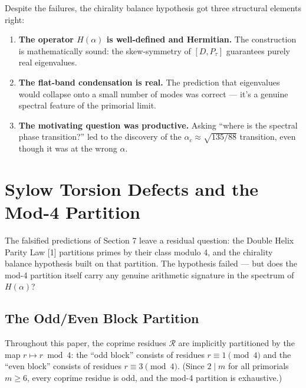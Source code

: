\documentclass[11pt,letterpaper]{article}
\theoremstyle{definition}
\theoremstyle{remark}
\begin{document}
Despite the failures, the chirality balance hypothesis got three structural elements right:

\begin{enumerate}
\item
  \textbf{The operator $H(\alpha)$ is well-defined and Hermitian.} The construction is mathematically sound: the skew-symmetry of $[D, P_\tau]$ guarantees purely real eigenvalues.
\item
  \textbf{The flat-band condensation is real.} The prediction that eigenvalues would collapse onto a small number of modes was correct --- it's a genuine spectral feature of the primorial limit.
\item
  \textbf{The motivating question was productive.} Asking ``where is the spectral phase transition?'' led to the discovery of the $\alpha_c \approx \sqrt{135/88}$ transition, even though it was at the wrong $\alpha$.
\end{enumerate}

\section{Sylow Torsion Defects and the Mod-4 Partition}\label{sylow-torsion-defects-and-the-mod-4-partition}

The falsified predictions of Section 7 leave a residual question: the Double Helix Parity Law [1] partitions primes by their class modulo 4, and the chirality balance hypothesis built on that partition. The hypothesis failed --- but does the mod-4 partition itself carry any genuine arithmetic signature in the spectrum of $H(\alpha)$?

\subsection{The Odd/Even Block Partition}\label{the-oddeven-block-partition}

Throughout this paper, the coprime residues $\mathcal{R}$ are implicitly partitioned by the map $r \mapsto r \bmod 4$: the ``odd block'' consists of residues $r \equiv 1 \pmod{4}$ and the ``even block'' consists of residues $r \equiv 3 \pmod{4}$. (Since $2 \mid m$ for all primorials $m \geq 6$, every coprime residue is odd, and the mod-4 partition is exhaustive.)
\end{document}
